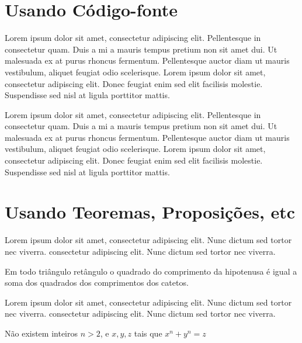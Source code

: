 \section{Usando Código-fonte}

Lorem ipsum dolor sit amet, consectetur adipiscing elit. Pellentesque in consectetur quam. Duis a mi a mauris tempus pretium non sit amet dui. Ut malesuada ex at purus rhoncus fermentum. Pellentesque auctor diam ut mauris vestibulum, aliquet feugiat odio scelerisque. Lorem ipsum dolor sit amet, consectetur adipiscing elit. Donec feugiat enim sed elit facilisis molestie. Suspendisse sed nisl at ligula porttitor mattis.

\begin{figure}[h!]
    \centering
\end{figure}

Lorem ipsum dolor sit amet, consectetur adipiscing elit. Pellentesque in consectetur quam. Duis a mi a mauris tempus pretium non sit amet dui. Ut malesuada ex at purus rhoncus fermentum. Pellentesque auctor diam ut mauris vestibulum, aliquet feugiat odio scelerisque. Lorem ipsum dolor sit amet, consectetur adipiscing elit. Donec feugiat enim sed elit facilisis molestie. Suspendisse sed nisl at ligula porttitor mattis.

\section{Usando Teoremas, Proposições, etc}

Lorem ipsum dolor sit amet, consectetur adipiscing elit. Nunc dictum sed tortor nec viverra. consectetur adipiscing elit. Nunc dictum sed tortor nec viverra.

\begin{teo}[Pitágoras]
	Em todo triângulo retângulo o quadrado do comprimento da
	hipotenusa é igual a soma dos quadrados dos comprimentos dos catetos.
\end{teo}


Lorem ipsum dolor sit amet, consectetur adipiscing elit. Nunc dictum sed tortor nec viverra. consectetur adipiscing elit. Nunc dictum sed tortor nec viverra.

\begin{teo}[Fermat]
	Não existem inteiros $n > 2$, e $x, y, z$ tais que $x^n + y^n = z$
\end{teo}


